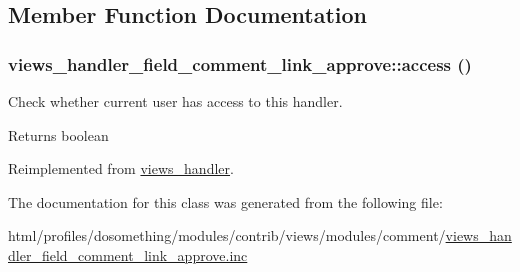 \subsection{Member Function Documentation}
\hypertarget{classviews__handler__field__comment__link__approve_aa6f8bce989b5c5dacce1d2390263a59a}{
\subsubsection[{access}]{\setlength{\rightskip}{0pt plus 5cm}views\_\-handler\_\-field\_\-comment\_\-link\_\-approve::access ()}}
\label{classviews__handler__field__comment__link__approve_aa6f8bce989b5c5dacce1d2390263a59a}
Check whether current user has access to this handler.

\begin{DoxyReturn}{Returns}
boolean 
\end{DoxyReturn}


Reimplemented from \hyperlink{classviews__handler_a3f2fbfe1e0849d06ae77149412b821f6}{views\_\-handler}.

The documentation for this class was generated from the following file:\begin{DoxyCompactItemize}
\item 
html/profiles/dosomething/modules/contrib/views/modules/comment/\hyperlink{views__handler__field__comment__link__approve_8inc}{views\_\-handler\_\-field\_\-comment\_\-link\_\-approve.inc}\end{DoxyCompactItemize}
